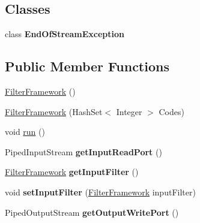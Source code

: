 \subsection*{Classes}
\begin{DoxyCompactItemize}
\item 
class {\bfseries End\+Of\+Stream\+Exception}
\end{DoxyCompactItemize}
\subsection*{Public Member Functions}
\begin{DoxyCompactItemize}
\item 
\hyperlink{class_system_b_1_1_filter_framework_af0fb99cef096610db3ccfc9eeca6a3b8}{Filter\+Framework} ()
\item 
\hyperlink{class_system_b_1_1_filter_framework_ab125a0cf88badca1a24b2cb08b9094a9}{Filter\+Framework} (Hash\+Set$<$ Integer $>$ Codes)
\item 
void \hyperlink{class_system_b_1_1_filter_framework_af2b50769cc9a468f7d1f51b64ceb1a4e}{run} ()
\item 
\hypertarget{class_system_b_1_1_filter_framework_a30dac48a81c5f39b55e544c0b1999b9b}{}Piped\+Input\+Stream {\bfseries get\+Input\+Read\+Port} ()\label{class_system_b_1_1_filter_framework_a30dac48a81c5f39b55e544c0b1999b9b}

\item 
\hypertarget{class_system_b_1_1_filter_framework_a5bf1aa8c882cf37b5a2c99c63e146ae4}{}\hyperlink{class_system_b_1_1_filter_framework}{Filter\+Framework} {\bfseries get\+Input\+Filter} ()\label{class_system_b_1_1_filter_framework_a5bf1aa8c882cf37b5a2c99c63e146ae4}

\item 
\hypertarget{class_system_b_1_1_filter_framework_a92730e25f45151347227efee0cc346a0}{}void {\bfseries set\+Input\+Filter} (\hyperlink{class_system_b_1_1_filter_framework}{Filter\+Framework} input\+Filter)\label{class_system_b_1_1_filter_framework_a92730e25f45151347227efee0cc346a0}

\item 
\hypertarget{class_system_b_1_1_filter_framework_a0e08a606fce18a98aec19ba175807dad}{}Piped\+Output\+Stream {\bfseries get\+Output\+Write\+Port} ()\label{class_system_b_1_1_filter_framework_a0e08a606fce18a98aec19ba175807dad}

\end{DoxyCompactItemize}
